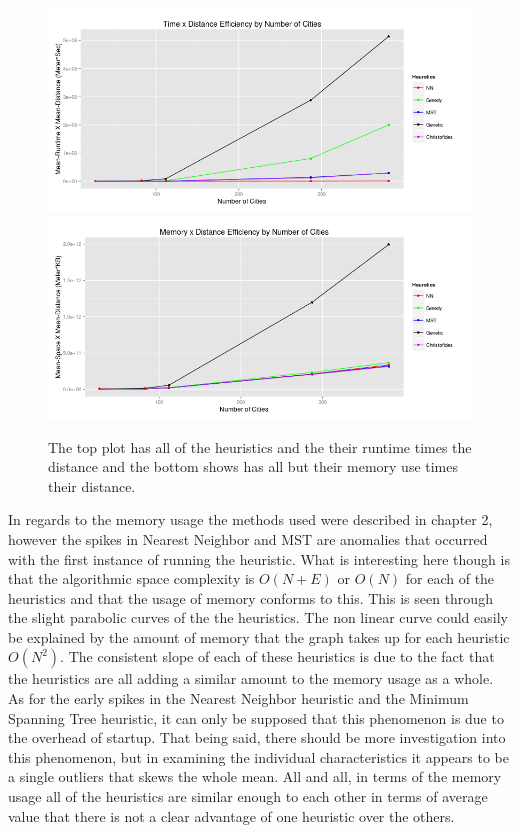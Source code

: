 \documentclass[midd]{thesis}
\newcommand{\tab}{\hspace*{2em}}
\begin{document}
\begin{figure}[h!]
	\begin{center}
	\caption{The top plot has all of the heuristics and the their runtime times the distance and the bottom shows has all but their memory use times their distance.}
	\includegraphics[width=.95\textwidth]{timexdistance_numcities}
	\includegraphics[width=.95\textwidth]{memxdistance_numcities}
	\end{center}
\end{figure}
\tab In regards to the memory usage the methods used were described in chapter 2, however the spikes in Nearest Neighbor and MST are anomalies that occurred with the first instance of running the heuristic. What is interesting here though is that the algorithmic space complexity is $O(N+E)$ or $O(N)$ for each of the heuristics and that the usage of memory conforms to this. This is seen through the slight parabolic curves of the the heuristics. The non linear curve could easily be explained by the amount of memory that the graph takes up for each heuristic $O(N^2)$. The consistent slope of each of these heuristics is due to the fact that the heuristics are all adding a similar amount to the memory usage as a whole. As for the early spikes in the Nearest Neighbor heuristic and the Minimum Spanning Tree heuristic, it can only be supposed that this phenomenon is due to the overhead of startup. That being said, there should be more investigation into this phenomenon, but in examining the individual characteristics it appears to be a single outliers that skews the whole mean. All and all, in terms of the memory usage all of the heuristics are similar enough to each other in terms of average value that there is not a clear advantage of one heuristic over the others.\\
\end{document}
